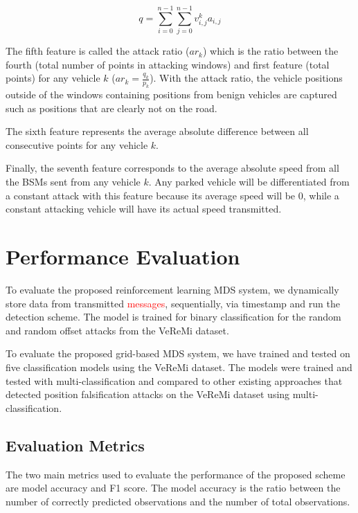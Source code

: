 \documentclass[conference]{IEEEtran}
\begin{document}
\begin{equation}
    q = \sum_{i = 0}^{n-1} \sum_{j = 0}^{n-1} v^k_{i,j} a_{i,j} 
\end{equation}

The fifth feature is called the attack ratio ($ar_k$) which is the ratio between the fourth (total number of points in attacking windows) and first feature (total points) for any vehicle $k$ ($ar_k = \frac{q_k}{p_k}$). With the attack ratio, the vehicle positions outside of the windows containing positions from benign vehicles are captured such as positions that are clearly not on the road.  

The sixth feature represents the average absolute difference between all consecutive points for any vehicle $k$.

Finally, the seventh feature corresponds to the average absolute speed from all the BSMs sent from any vehicle $k$. Any parked vehicle will be differentiated from a constant attack with this feature because its average speed will be $0$, while a constant attacking vehicle will have its actual speed transmitted.

 

\section{Performance Evaluation}

To evaluate the proposed reinforcement learning MDS system, we dynamically store data from transmitted \textcolor{red}{messages}, sequentially, via timestamp and run the detection scheme. The model is trained for binary classification for the random and random offset attacks from the VeReMi dataset. 

To evaluate the proposed grid-based MDS system, we have trained and tested on five classification models using the VeReMi dataset. The models were trained and tested with multi-classification and compared to other existing approaches that detected position falsification attacks on the VeReMi dataset using multi-classification.

\subsection{Evaluation Metrics}

The two main metrics used to evaluate the performance of the proposed scheme are model accuracy and F1 score. The model accuracy is the ratio between the number of correctly predicted observations and the number of total observations.
\end{document}
